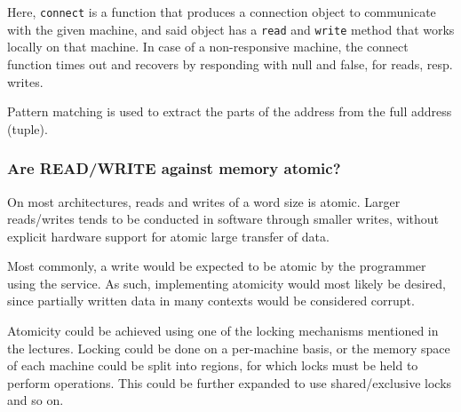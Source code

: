 \documentclass[11pt,a4paper]{article}
\begin{document}
Here, \texttt{connect} is a function that produces a connection object to
communicate with the given machine, and said object has a \texttt{read} and
\texttt{write} method that works locally on that machine. In case of a non-responsive
machine, the connect function times out and recovers by responding with null and false,
for reads, resp. writes.

Pattern matching is used to extract the parts of the address from the full
address (tuple).

\subsubsection{Are READ/WRITE against memory atomic?}
On most architectures, reads and writes of a word size is atomic. Larger 
reads/writes tends to be conducted in software through smaller writes,
without explicit hardware support for atomic large transfer of data.

Most commonly, a write would be expected to be atomic by the programmer using
the service. As such, implementing atomicity would most likely be desired, since
partially written data in many contexts would be considered corrupt.

Atomicity could be achieved using one of the locking mechanisms mentioned
in the lectures. Locking could be done on a per-machine basis, or the
memory space of each machine could be split into regions, for which locks
must be held to perform operations. This could be further expanded to use
shared/exclusive locks and so on.

\subsubsection{}
\end{document}
